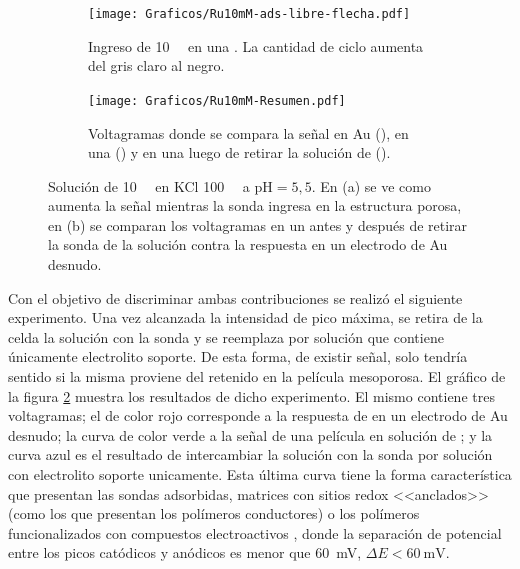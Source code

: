 			\begin{figure}[th]
				\begin{subfigure}[t]{0.495\textwidth}
				\texttt{[image: Graficos/Ru10mM-ads-libre-flecha.pdf]}
		        \caption{Ingreso de \ru\space \SI{10}{\milli\Molar} en una \pdmF. La cantidad de ciclo aumenta del gris  claro al negro.}
		        \label{fig:Ru10mM_ingreso}
		      	\end{subfigure}
		      	\begin{subfigure}[t]{0.495\textwidth}
				\texttt{[image: Graficos/Ru10mM-Resumen.pdf]}
		        \caption{Voltagramas donde se compara la señal en Au  (\usebox{\punteado}), en una \pdmF\space(\usebox{\gris}) y en una \pdmF\space luego de retirar la solución de \ru (\usebox{\negro}).}
		        \label{fig:Ru10mM-resumen}
		      	\end{subfigure}
		      	\caption[Adsorción de sonda positiva en \pdmF]{Solución de \ru\space \SI{10}{\milli\Molar} en KCl \SI{100}{\milli\Molar} a $\text{pH}=5,5$. En (a) se ve como aumenta la señal mientras la sonda ingresa en la estructura porosa, en (b) se comparan los voltagramas en un \pdmF\space antes y después de retirar la sonda de la solución contra la respuesta en un electrodo de Au  desnudo.}
		      	\label{fig:primero-Ru10mM}
		      	\end{figure}

		Con el objetivo de discriminar ambas contribuciones se realizó el siguiente experimento. Una vez alcanzada la intensidad de pico máxima, se retira de la celda la solución con la sonda y se reemplaza por solución que contiene únicamente electrolito soporte. De esta forma, de existir señal, solo tendría sentido si la misma proviene del \ru\space retenido en la película mesoporosa. El gráfico de la figura \ref{fig:Ru10mM-resumen} muestra los resultados de dicho experimento. El mismo contiene tres voltagramas; el de color rojo corresponde a la respuesta de \ru\space en un electrodo de Au  desnudo; la curva de color verde a la señal de una película en solución de \ru; y la curva azul es el resultado de intercambiar la solución con la sonda por solución con electrolito soporte unicamente. Esta última curva tiene la forma característica que presentan las sondas adsorbidas, matrices con sitios redox <<anclados>>\cite{ybarra2005} (como los que presentan los polímeros conductores) o los polímeros funcionalizados con compuestos electroactivos \cite{Rohlfing2005,Vila2015}, donde la separación de potencial entre los picos catódicos y anódicos es menor que \SI{60}{\milli\volt}, $\Delta E < \SI{60}{\milli\volt}$\cite{Wi2000}.

